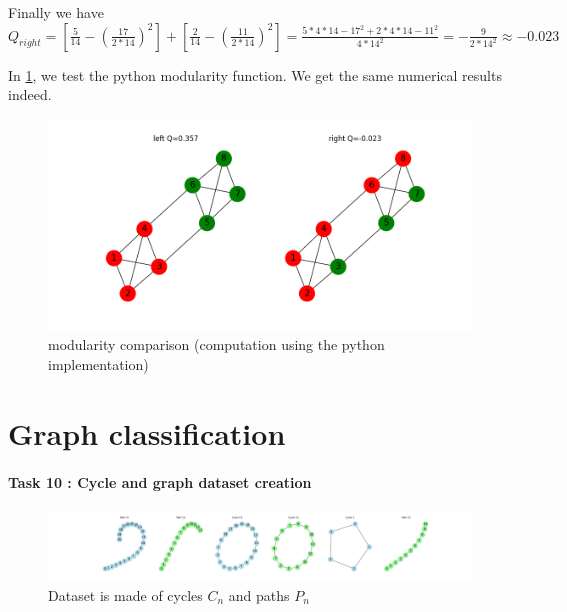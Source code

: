 \documentclass[a4paper]{article}
\begin{document}
Finally we have $Q_{right} = \left[\frac{5}{14} - (\frac{17}{2*14})^2 \right] + \left[\frac{2}{14} - (\frac{11}{2*14})^2 \right] 
= \frac{5*4*14-17^2 + 2*4*14-11^2}{4*14^2} =-\frac{9}{2*14^2}\approx -0.023$

In \ref{fig:modularity_computation}, we test the python modularity function.
We get the same numerical results indeed.

\begin{figure}[ht]
    \centering
    \includegraphics[width=.8\textwidth]{figures/modularity_computation.png}
    \caption{modularity comparison (computation using the python implementation)}
    \label{fig:modularity_computation}
\end{figure}



\pagebreak
\part[short]{Graph classification}

\subsection*{Task 10 : Cycle and graph dataset creation}

\begin{figure}[ht]
        \centering
        \includegraphics[width=1.\textwidth]{figures/cycle_and_paths_dataset.png}
        \caption{Dataset is made of cycles $C_n$ and paths $P_n$}
        \label{fig:cycle_and_paths_dataset}
\end{figure}
\end{document}
